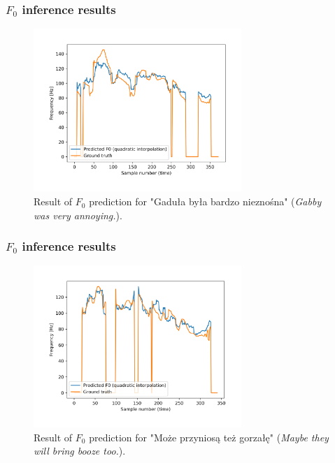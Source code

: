 \documentclass[a4paper,9pt]{beamer}
\theoremstyle{mytheoremstyle}
\begin{document}
\begin{frame}
\frametitle{$F_{0}$ inference results}
\begin{figure}
\begin{center}
  \includegraphics[width=0.7\textwidth]{res/amu_pl_ilo_BAZA_2006C_C0221_simple_pred_freq}
\end{center}
	\caption{Result of $F_{0}$ prediction for "Gadu\l{}a by\l{}a bardzo niezno\'sna" (\textit{Gabby was very annoying.}).}
\end{figure}
\end{frame}

\begin{frame}
\frametitle{$F_{0}$ inference results}
\begin{figure}
\begin{center}
  \includegraphics[width=0.7\textwidth]{res/amu_pl_ilo_BAZA_2006C_C0271_simple_pred_freq}
\end{center}
	\caption{Result of $F_0$ prediction for "Mo\.ze przynios\k{a} te\.z gorza\l{}\k{e}" (\textit{Maybe they will bring booze too.}).}
\end{figure}
\end{frame}
\end{document}
